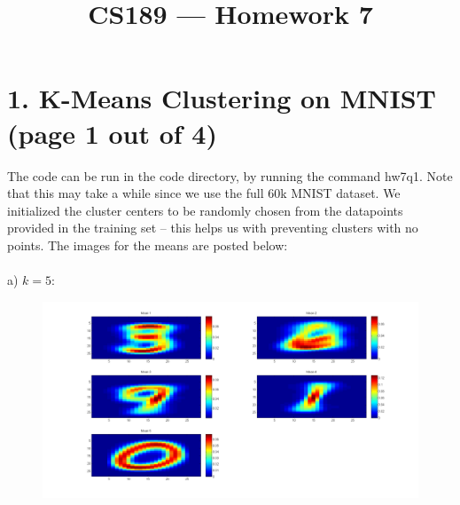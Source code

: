 \documentclass[11pt]{article}
\title{CS189 --- Homework 7}
\author{\Name}
\begin{document}
\maketitle
\vspace{5em}
\section*{1. K-Means Clustering on MNIST (page 1 out of 4)}
The code can be run in the code directory, by running the command hw7q1. Note that this may take a while since we use the full 60k MNIST dataset. We initialized the cluster centers to be randomly chosen from the datapoints provided in the training set -- this helps us with preventing clusters with no points. The images for the means are posted below:
\\\\
a) $k = 5$:
\begin{figure}[ht!]
\centering
\includegraphics[width=180mm]{images/mean5-1.png}
\label{overflow}
\end{figure}
\newpage
\end{document}
